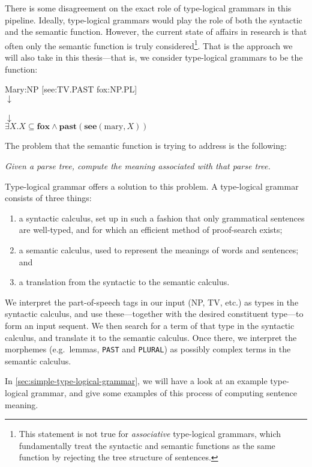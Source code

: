 There is some disagreement on the exact role of type-logical grammars in
this pipeline. Ideally, type-logical grammars would play the role of
both the syntactic and the semantic function. However, the current
state of affairs in research is that often only the semantic function
is truly considered\footnote{%
  This statement is not true for \emph{associative} type-logical
  grammars, which fundamentally treat the syntactic and semantic
  functions as the same function by rejecting the tree structure of
  sentences.
}. That is the approach we will also take in this thesis---that is,
we consider type-logical grammars to be the function:
\begin{center}
  Mary:NP [see:TV.PAST fox:NP.PL]\\
  $\downarrow$\\
  \\
  $\downarrow$\\
  $\exists X.X\subseteq\mathbf{fox}\land\mathbf{past}(\mathbf{see}(\text{mary},X))$
\end{center}
The problem that the semantic function is trying to address is the
following:
\begin{center}\itshape
  Given a parse tree, compute the meaning associated with that parse tree.
\end{center}
Type-logical grammar offers a solution to this problem. A type-logical
grammar consists of three things:
\begin{enumerate}[label=(\arabic*)]
\item a syntactic calculus, set up in such a fashion that only
  grammatical sentences are well-typed, and for which an efficient
  method of proof-search exists;
\item a semantic calculus, used to represent the meanings of words and
  sentences; and
\item a translation from the syntactic to the semantic calculus.
\end{enumerate}
We interpret the part-of-speech tags in our input (NP, TV, etc.) as
types in the syntactic calculus, and use these---together with the
desired constituent type---to form an input sequent. We then search
for a term of that type in the syntactic calculus, and translate it to
the semantic calculus. Once there, we interpret the morphemes
(e.g.\ lemmas, \texttt{PAST} and \texttt{PLURAL}) as possibly complex
terms in the semantic calculus.

In \autoref{sec:simple-type-logical-grammar}, we will have a look at
an example type-logical grammar, and give some examples of this
process of computing sentence meaning.



